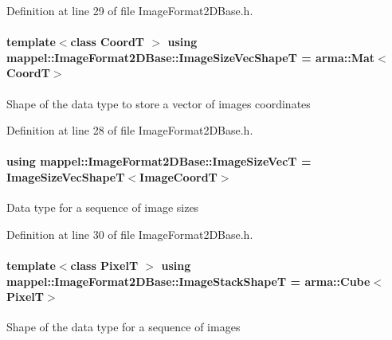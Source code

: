 Definition at line 29 of file Image\+Format2\+D\+Base.\+h.

\paragraph[{\texorpdfstring{Image\+Size\+Vec\+ShapeT}{ImageSizeVecShapeT}}]{\setlength{\rightskip}{0pt plus 5cm}template$<$class CoordT $>$ using {\bf mappel\+::\+Image\+Format2\+D\+Base\+::\+Image\+Size\+Vec\+ShapeT} =  arma\+::\+Mat$<$CoordT$>$}\hypertarget{classmappel_1_1ImageFormat2DBase_afe9ededf04942330121003e3dd8f9311}{}\label{classmappel_1_1ImageFormat2DBase_afe9ededf04942330121003e3dd8f9311}
Shape of the data type to store a vector of image\textquotesingle{}s coordinates 

Definition at line 28 of file Image\+Format2\+D\+Base.\+h.

\paragraph[{\texorpdfstring{Image\+Size\+VecT}{ImageSizeVecT}}]{\setlength{\rightskip}{0pt plus 5cm}using {\bf mappel\+::\+Image\+Format2\+D\+Base\+::\+Image\+Size\+VecT} =  {\bf Image\+Size\+Vec\+ShapeT}$<${\bf Image\+CoordT}$>$}\hypertarget{classmappel_1_1ImageFormat2DBase_aa88536c52195a927cf32558856f05a13}{}\label{classmappel_1_1ImageFormat2DBase_aa88536c52195a927cf32558856f05a13}
Data type for a sequence of image sizes 

Definition at line 30 of file Image\+Format2\+D\+Base.\+h.

\paragraph[{\texorpdfstring{Image\+Stack\+ShapeT}{ImageStackShapeT}}]{\setlength{\rightskip}{0pt plus 5cm}template$<$class PixelT $>$ using {\bf mappel\+::\+Image\+Format2\+D\+Base\+::\+Image\+Stack\+ShapeT} =  arma\+::\+Cube$<$PixelT$>$}\hypertarget{classmappel_1_1ImageFormat2DBase_ae2e123c8a5a5ab00f89eaea04d2431cb}{}\label{classmappel_1_1ImageFormat2DBase_ae2e123c8a5a5ab00f89eaea04d2431cb}
Shape of the data type for a sequence of images 

